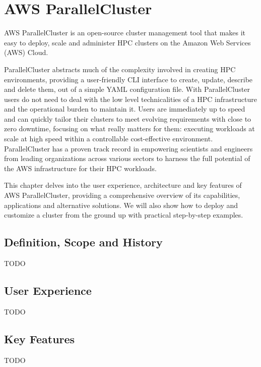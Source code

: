 \chapter{AWS ParallelCluster}

AWS ParallelCluster is an open-source cluster management tool that makes it easy to deploy, scale and
administer HPC clusters on the Amazon Web Services (AWS) Cloud.

ParallelCluster abstracts much of the complexity involved in creating HPC environments, providing a
user-friendly CLI interface to create, update, describe and delete them, out of a simple YAML configuration file.
With ParallelCluster users do not need to deal with the low level technicalities of a HPC infrastructure and
the operational burden to maintain it.
Users are immediately up to speed and can quickly tailor their clusters to meet evolving requirements with
close to zero downtime, focusing on what really matters for them: executing workloads at scale at high speed
within a controllable cost-effective environment.
ParallelCluster has a proven track record in empowering scientists and engineers from leading organizations
across various sectors to harness the full potential of the AWS infrastructure for their HPC workloads.

This chapter delves into the user experience, architecture and key features of AWS ParallelCluster, providing
a comprehensive overview of its capabilities, applications and alternative solutions.
We will also show how to deploy and customize a cluster from the ground up with practical step-by-step examples.

\section{Definition, Scope and History}
\label{sec:aws-parallelcluster-definition-scope-and-history}

TODO

\section{User Experience}
\label{sec:user-experience}

TODO

\section{Key Features}
\label{sec:key-features}

TODO

